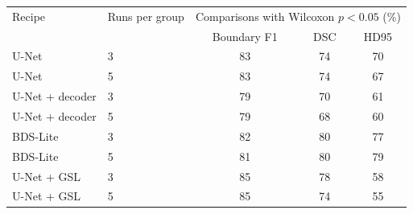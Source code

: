 \begin{tabular}{llccc}
\toprule
Recipe & Runs per group & \multicolumn{3}{c}{Comparisons with Wilcoxon $p<0.05$ (\%)} \\
 & & Boundary F1 & DSC & HD95 \\
\midrule
U-Net & 3 & 83 & 74 & 70 \\
U-Net & 5 & 83 & 74 & 67 \\
U-Net + decoder & 3 & 79 & 70 & 61 \\
U-Net + decoder & 5 & 79 & 68 & 60 \\
BDS-Lite & 3 & 82 & 80 & 77 \\
BDS-Lite & 5 & 81 & 80 & 79 \\
U-Net + GSL & 3 & 85 & 78 & 58 \\
U-Net + GSL & 5 & 85 & 74 & 55 \\
\bottomrule
\end{tabular}
